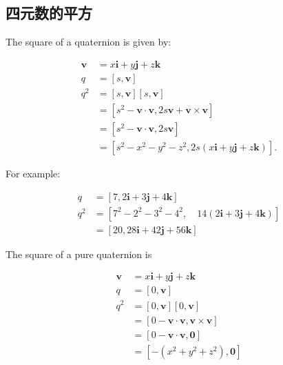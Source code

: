     \subsection{四元数的平方}
    The square of a quaternion is given by:

    $$
        \begin{aligned}
            \mathbf{v} & =x \mathbf{i}+y \mathbf{j}+z \mathbf{k}                                                      \\
            q          & =[s, \mathbf{v}]                                                                             \\
            q^{2}      & =[s, \mathbf{v}][s, \mathbf{v}]                                                              \\
                       & =\left[s^{2}-\mathbf{v} \cdot \mathbf{v}, 2 s \mathbf{v}+\mathbf{v} \times \mathbf{v}\right] \\
                       & =\left[s^{2}-\mathbf{v} \cdot \mathbf{v}, 2 s \mathbf{v}\right]                              \\
                       & =\left[s^{2}-x^{2}-y^{2}-z^{2}, 2 s(x \mathbf{i}+y \mathbf{j}+z \mathbf{k})\right] .
        \end{aligned}
    $$

    For example:

    $$
        \begin{aligned}
            q     & =[7,2 \mathbf{i}+3 \mathbf{j}+4 \mathbf{k}]                                             \\
            q^{2} & =\left[7^{2}-2^{2}-3^{2}-4^{2}, \quad 14(2 \mathbf{i}+3 \mathbf{j}+4 \mathbf{k})\right] \\
                  & =[20,28 \mathbf{i}+42 \mathbf{j}+56 \mathbf{k}]
        \end{aligned}
    $$

    The square of a pure quaternion is

    $$
        \begin{aligned}
            \mathbf{v} & =x \mathbf{i}+y \mathbf{j}+z \mathbf{k}                        \\
            q          & =[0, \mathbf{v}]                                               \\
            q^{2}      & =[0, \mathbf{v}][0, \mathbf{v}]                                \\
                       & =[0-\mathbf{v} \cdot \mathbf{v}, \mathbf{v} \times \mathbf{v}] \\
                       & =[0-\mathbf{v} \cdot \mathbf{v}, \mathbf{0}]                   \\
                       & =\left[-\left(x^{2}+y^{2}+z^{2}\right), \mathbf{0}\right]
        \end{aligned}
    $$

